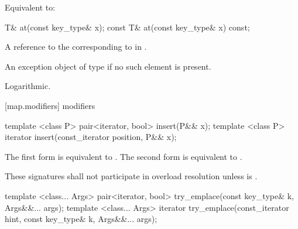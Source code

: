 \begin{itemdescr}
\pnum
\effects
Equivalent to: 
\end{itemdescr}

%
\begin{itemdecl}
T&       at(const key_type& x);
const T& at(const key_type& x) const;
\end{itemdecl}

\begin{itemdescr}
\pnum
\returns
A reference to the  corresponding to  in .

\pnum
\throws
An exception object of type  if
no such element is present.

\pnum
\complexity Logarithmic.
\end{itemdescr}

[map.modifiers]{ modifiers}

%
%
\begin{itemdecl}
template <class P> pair<iterator, bool> insert(P&& x);
template <class P> iterator insert(const_iterator position, P&& x);
\end{itemdecl}

\begin{itemdescr}
\pnum
\effects
The first form is equivalent to 
. The second form is
equivalent to .

\pnum
\remarks
These signatures shall not participate in overload resolution
unless  is
.
\end{itemdescr}

%
%
\begin{itemdecl}
template <class... Args> pair<iterator, bool> try_emplace(const key_type& k, Args&&... args);
template <class... Args> iterator try_emplace(const_iterator hint, const key_type& k, Args&&... args);
\end{itemdecl}

